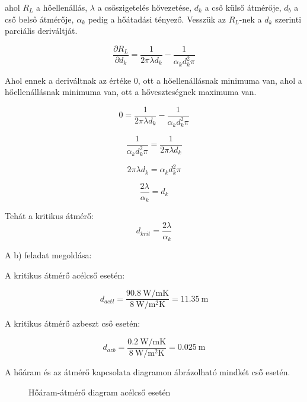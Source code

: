 ahol \(R_L\) a hőellenállás, \(\lambda\) a csőszigetelés hővezetése, \(d_k\) a cső külső átmérője, \(d_b\) a cső belső átmérője, \(\alpha_k\) pedig a hőátadási tényező. Vesszük az \(R_L\)-nek a \(d_k\) szerinti parciális deriváltját.

\begin{equation}
	\frac{\partial R_L}{\partial d_k} = \frac{1}{2 \pi \lambda d_k} - \frac{1}{\alpha_k d_k^2 \pi}
\end{equation}

Ahol ennek a deriváltnak az értéke \(0\), ott a hőellenállásnak minimuma van, ahol a hőellenállásnak minimuma van, ott a hőveszteségnek maximuma van.

\[0 = \frac{1}{2 \pi \lambda d_k}-\frac{1}{\alpha_k d_k^2 \pi}\]

\[\frac{1}{\alpha_k d_k^2 \pi} = \frac{1}{2 \pi \lambda d_k}\]

\[2 \pi \lambda d_k = \alpha_k d_k^2 \pi\]

\[\frac{2 \lambda}{\alpha_k} = d_k\]

Tehát a kritikus átmérő:
\begin{equation}
	d_{krit} = \frac{2 \lambda}{\alpha_k}
\end{equation}

A b) feladat megoldása:

A kritikus átmérő acélcső esetén:

\[d_{\textit{acél}} = \frac{ \SI{90,8}{\watt\per\meter\kelvin}}{\SI{8}{\watt\per\meter\squared\kelvin}} = \SI{11,35}{\meter}\]

A kritikus átmérő azbeszt cső esetén:

\[d_{azb} = \frac{ \SI{0,2}{\watt\per\meter\kelvin}}{\SI{8}{\watt\per\meter\squared\kelvin}} = \SI{0,025}{\meter}\]

A hőáram és az átmérő kapcsolata diagramon ábrázolható mindkét cső esetén.

\begin{figure}[h]
	\centering
	\label{figure:guh7ud-vgpvd}
	\caption{Hőáram-átmérő diagram acélcső esetén}
\end{figure}

